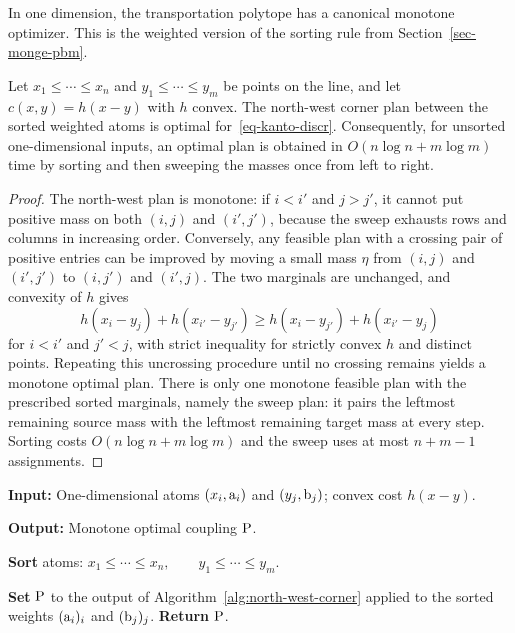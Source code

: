 In one dimension, the transportation polytope has a canonical monotone optimizer. This is the weighted version of the sorting rule from Section~\ref{sec-monge-pbm}.

\begin{prop}\label{prop-1d-weighted-sweep}
	Let $x_1\leq\cdots\leq x_n$ and $y_1\leq\cdots\leq y_m$ be points on the line, and let $c(x,y)=h(x-y)$ with $h$ convex. The north-west corner plan between the sorted weighted atoms is optimal for~\eqref{eq-kanto-discr}. Consequently, for unsorted one-dimensional inputs, an optimal plan is obtained in $O(n\log n+m\log m)$ time by sorting and then sweeping the masses once from left to right.
\end{prop}
\begin{proof}
	The north-west plan is monotone: if $i<i'$ and $j>j'$, it cannot put positive mass on both $(i,j)$ and $(i',j')$, because the sweep exhausts rows and columns in increasing order. Conversely, any feasible plan with a crossing pair of positive entries can be improved by moving a small mass $\eta$ from $(i,j)$ and $(i',j')$ to $(i,j')$ and $(i',j)$. The two marginals are unchanged, and convexity of $h$ gives
	\[
		h(x_i-y_j)+h(x_{i'}-y_{j'})
		\geq
		h(x_i-y_{j'})+h(x_{i'}-y_j)
	\]
	for $i<i'$ and $j'<j$, with strict inequality for strictly convex $h$ and distinct points. Repeating this uncrossing procedure until no crossing remains yields a monotone optimal plan. There is only one monotone feasible plan with the prescribed sorted marginals, namely the sweep plan: it pairs the leftmost remaining source mass with the leftmost remaining target mass at every step. Sorting costs $O(n\log n+m\log m)$ and the sweep uses at most $n+m-1$ assignments.
\end{proof}

\begin{alg}\label{alg:weighted-one-dimensional-sweep}
\textbf{Input:} One-dimensional atoms $(x_i,\a_i)$ and $(y_j,\b_j)$; convex cost $h(x-y)$.

\textbf{Output:} Monotone optimal coupling $\P$.

\textbf{Sort} atoms:
\(x_1\leq\cdots\leq x_n, \qquad y_1\leq\cdots\leq y_m.\)

\textbf{Set} $\P$ to the output of Algorithm~\ref{alg:north-west-corner} applied to the sorted weights $(\a_i)_i$ and $(\b_j)_j$.
\textbf{Return} $\P$.
\end{alg}

